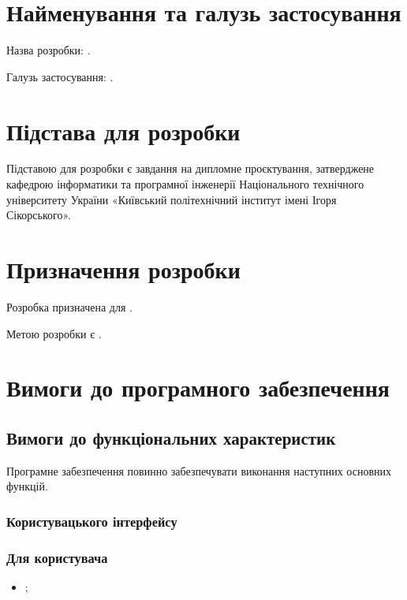 \documentclass{kpi-thesis}
\begin{document}
\mainmatter
\tableofcontents

\section{Найменування та галузь застосування}
Назва розробки: \kpiTitle.

Галузь застосування: .

\section{Підстава для розробки}
Підставою для розробки є завдання на дипломне проєктування, затверджене кафедрою інформатики та програмної інженерії Національного технічного університету України «Київський політехнічний інститут імені Ігоря Сікорського».

\section{Призначення розробки}
Розробка призначена для .

Метою розробки є .

\section{Вимоги до програмного забезпечення}
\subsection{Вимоги до функціональних характеристик}
Програмне забезпечення повинно забезпечувати виконання наступних основних функцій.

\subsubsection{Користувацького інтерфейсу}

\subsubsection{Для користувача}
\begin{itemize}
\item {};
\end{itemize}
\end{document}
